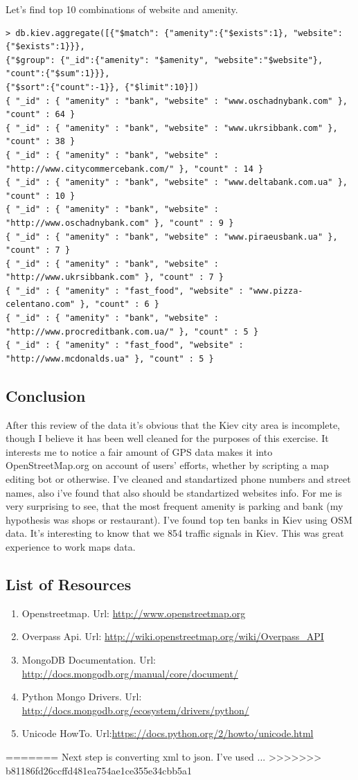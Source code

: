 \documentclass[a4paper,12pt]{article}
\begin{document}
Let's find top 10 combinations of website and amenity.
\begin{lstlisting}[style=DOS]
> db.kiev.aggregate([{"$match": {"amenity":{"$exists":1}, "website":{"$exists":1}}}, 
{"$group": {"_id":{"amenity": "$amenity", "website":"$website"}, "count":{"$sum":1}}}, 
{"$sort":{"count":-1}}, {"$limit":10}])
{ "_id" : { "amenity" : "bank", "website" : "www.oschadnybank.com" }, "count" : 64 }
{ "_id" : { "amenity" : "bank", "website" : "www.ukrsibbank.com" }, "count" : 38 }
{ "_id" : { "amenity" : "bank", "website" : "http://www.citycommercebank.com/" }, "count" : 14 }
{ "_id" : { "amenity" : "bank", "website" : "www.deltabank.com.ua" }, "count" : 10 }
{ "_id" : { "amenity" : "bank", "website" : "http://www.oschadnybank.com" }, "count" : 9 }
{ "_id" : { "amenity" : "bank", "website" : "www.piraeusbank.ua" }, "count" : 7 }
{ "_id" : { "amenity" : "bank", "website" : "http://www.ukrsibbank.com" }, "count" : 7 }
{ "_id" : { "amenity" : "fast_food", "website" : "www.pizza-celentano.com" }, "count" : 6 }
{ "_id" : { "amenity" : "bank", "website" : "http://www.procreditbank.com.ua/" }, "count" : 5 }
{ "_id" : { "amenity" : "fast_food", "website" : "http://www.mcdonalds.ua" }, "count" : 5 }
\end{lstlisting}

\subsection*{Conclusion}
After this review of the data it’s obvious that the Kiev city area is incomplete, though I believe it has been well cleaned for the purposes of this exercise. It interests me to notice a fair amount of GPS data makes it into OpenStreetMap.org on account of users’ efforts, whether by scripting a map editing bot or otherwise. I've cleaned and standartized phone numbers and street names, also i've found that also should be standartized websites info. For me is very surprising to see, that the most frequent amenity is parking and bank (my hypothesis was shops or restaurant). I've found top ten banks in Kiev using OSM data. It's interesting to know that we 854 traffic signals in Kiev. This was great experience to work maps data.

\subsection*{List of Resources}
\begin{enumerate}
\item Openstreetmap. Url: \url{http://www.openstreetmap.org}
\item Overpass Api. Url: \url{http://wiki.openstreetmap.org/wiki/Overpass_API}
\item MongoDB Documentation. Url: \url{http://docs.mongodb.org/manual/core/document/}
\item Python Mongo Drivers. Url: \url{http://docs.mongodb.org/ecosystem/drivers/python/}
\item Unicode HowTo. Url:\url{https://docs.python.org/2/howto/unicode.html}
\end{enumerate}
=======
Next step is converting xml to json. I've used ...
>>>>>>> b81186fd26ccffd481ea754ae1ce355e34cbb5a1
\end{document}
